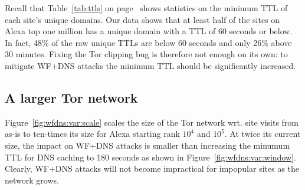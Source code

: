 Recall that Table~\ref{tab:ttls} on page~\pageref{tab:ttls} shows statistics on
the minimum TTL of each site's unique domains. Our data shows that at least
half of the sites on Alexa top one million has a unique domain with a TTL of
60 seconds or below.
In fact, 48\% of the raw unique TTLs are below 60 seconds and only
26\% above 30 minutes. Fixing the Tor clipping bug is therefore not enough on
its own: to mitigate WF+DNS attacks the minimum TTL should be significantly
increased.

\subsection{A larger Tor network}
Figure~\ref{fig:wfdns:var:scale} scales the size of the Tor network wrt. site
visits from as-is to ten-times its size for Alexa starting rank $10^4$ and
$10^5$. At twice its current size, the impact on WF+DNS attacks is smaller than
increasing the minumum TTL for DNS caching to 180 seconds as shown in
Figure~\ref{fig:wfdns:var:window}. Clearly, WF+DNS attacks will not become
impractical for impopular sites as the network grows.

